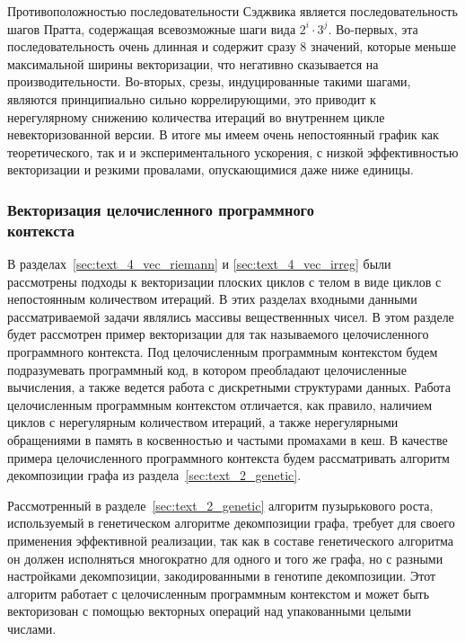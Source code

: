 Противоположностью последовательности Сэджвика является последовательность шагов Пратта, содержащая всевозможные шаги вида $2^i \cdot 3^j$.
Во-первых, эта последовательность очень длинная и содержит сразу 8 значений, которые меньше максимальной ширины векторизации, что негативно сказывается на производительности.
Во-вторых, срезы, индуцированные такими шагами, являются принципиально сильно коррелирующими, это приводит к нерегулярному снижению количества итераций во внутреннем цикле невекторизованной версии.
В итоге мы имеем очень непостоянный график как теоретического, так и и экспериментального ускорения, с низкой эффективностью векторизации\label{term:vec_eff6} и резкими провалами, опускающимися даже ниже единицы.

\subsubsection{Векторизация целочисленного программного \\ контекста}\label{sec:text_4_integer}

В разделах~\ref{sec:text_4_vec_riemann} и \ref{sec:text_4_vec_irreg} были рассмотрены подходы к векторизации\label{term:vectorization5} плоских циклов\label{term:flat_loop5} с телом в виде циклов с непостоянным количеством итераций.
В этих разделах входными данными рассматриваемой задачи являлись массивы вещественнных чисел.
В этом разделе будет рассмотрен пример векторизации для так называемого целочисленного программного контекста\label{term:integer_context}.
Под целочисленным программным контекстом будем подразумевать программный код, в котором преобладают целочисленные вычисления, а также ведется работа с дискретными структурами данных.
Работа целочисленным программным контекстом отличается, как правило, наличием циклов с нерегулярным количеством итераций, а также нерегулярными обращениями в память в косвенностью и частыми промахами в кеш.
В качестве примера целочисленного программного контекста будем рассматривать алгоритм декомпозиции графа из раздела~\ref{sec:text_2_genetic}.

Рассмотренный в разделе~\ref{sec:text_2_genetic} алгоритм пузырькового роста\label{term:alg_decomp_bubble2}, используемый в генетическом алгоритме декомпозиции\label{term:alg_decomp_gen2} графа, требует для своего применения эффективной реализации, так как в составе генетического алгоритма он должен исполняться многократно для одного и того же графа, но с разными настройками декомпозиции, закодированными в генотипе декомпозиции\label{term:genotype3}.
Этот алгоритм работает с целочисленным программным контекстом и может быть векторизован с помощью векторных операций над упакованными целыми числами.

